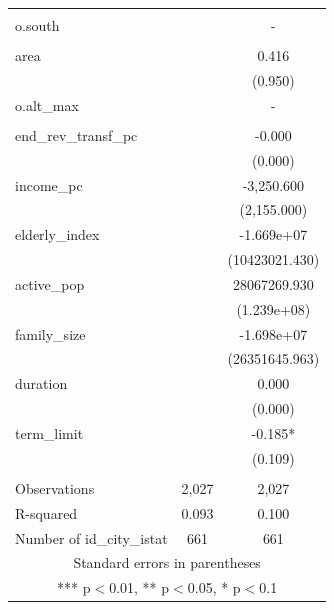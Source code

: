 \documentclass[]{article}
\begin{document}
\begin{tabular}{lcc}
 &  &  \\
o.south &  & - \\
 &  &  \\
area &  & 0.416 \\
 &  & (0.950) \\
o.alt\_max &  & - \\
 &  &  \\
end\_rev\_transf\_pc &  & -0.000 \\
 &  & (0.000) \\
income\_pc &  & -3,250.600 \\
 &  & (2,155.000) \\
elderly\_index &  & -1.669e+07 \\
 &  & (10423021.430) \\
active\_pop &  & 28067269.930 \\
 &  & (1.239e+08) \\
family\_size &  & -1.698e+07 \\
 &  & (26351645.963) \\
duration &  & 0.000 \\
 &  & (0.000) \\
term\_limit &  & -0.185* \\
 &  & (0.109) \\
 &  &  \\
Observations & 2,027 & 2,027 \\
R-squared & 0.093 & 0.100 \\
 Number of id\_city\_istat & 661 & 661 \\ \hline
\multicolumn{3}{c}{ Standard errors in parentheses} \\
\multicolumn{3}{c}{ *** p$<$0.01, ** p$<$0.05, * p$<$0.1} \\
\end{tabular}
\end{document}
